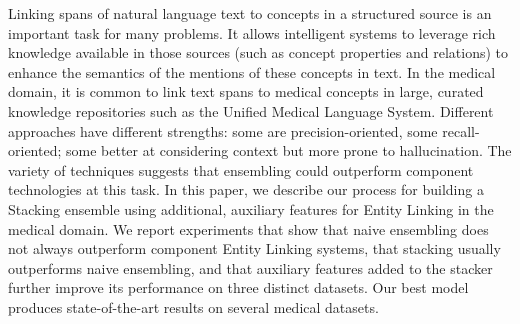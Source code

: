 Linking spans of natural language text to concepts in a structured source is an important task for many problems. It allows intelligent systems to leverage rich knowledge available in those sources (such as concept properties and relations) to enhance the semantics of the mentions of these concepts in text. In the medical domain, it is common to link text spans to medical concepts in large, curated knowledge repositories such as the Unified Medical Language System. Different approaches have different strengths: some are precision-oriented, some recall-oriented; some better at considering context but more prone to hallucination. The variety of techniques suggests that ensembling could outperform component technologies at this task. In this paper, we describe our process for building a Stacking ensemble using additional, auxiliary features for Entity Linking in the medical domain. We report experiments that show that naive ensembling does not always outperform component Entity Linking systems, that stacking usually outperforms naive ensembling, and that auxiliary features added to the stacker further improve its performance on three distinct datasets. Our best model produces state-of-the-art results on several medical datasets.
